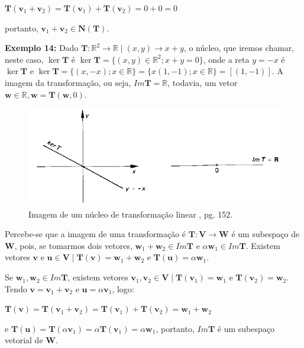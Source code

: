 \centerline{$\mathbf{T}(\mathbf{v}_1 + \mathbf{v}_2) = \mathbf{T}(\mathbf{v}_1) + \mathbf{T}(\mathbf{v}_2) = 0 + 0 = 0$}

\noindent portanto, $\mathbf{v}_1 + \mathbf{v}_2 \in \mathbf{N}(\mathbf{T})$. 

\noindent\textbf{Exemplo 14:} Dado $\mathbf{T}: \mathbb{R}^2 \longrightarrow \mathbb{R} \mid (x, y) \rightarrow x + y$, o núcleo, que iremos chamar, neste caso, $\ker\mathbf{T}$ é $\ker\mathbf{T} = \{(x, y) \in \mathbb{R}^2; x + y = 0\}$, onde a reta $y = -x$ é $\ker\mathbf{T}$ e $\ker\mathbf{T} = \{(x, -x); x \in \mathbb{R}\} = \{x(1, -1); x \in \mathbb{R}\} = [(1, -1)]$. A imagem da transformação, ou seja, $Im\mathbf{T} = \mathbb{R}$, todavia, um vetor $\mathbf{w} \in \mathbb{R}, \mathbf{w} = \mathbf{T}(\mathbf{w}, 0)$.

\begin{figure}[H]
	\centering
	\includegraphics[scale=1.00]{t_nucleo2.png}
	\caption{Imagem de um núcleo de transformação linear \cite{boldrini1980}, pg. 152.}
\end{figure}

Percebe-se que a imagem de uma transformação é $\mathbf{T}: \mathbf{V} \longrightarrow \mathbf{W}$ é um subespaço de $\mathbf{W}$, pois, se tomarmos dois vetores, $\mathbf{w}_1 + \mathbf{w}_2 \in Im\mathbf{T}$ e $\alpha\mathbf{w}_1 \in Im\mathbf{T}$. Existem vetores $\mathbf{v}$ e $\mathbf{u} \in \mathbf{V} \mid \mathbf{T}(\mathbf{v}) = \mathbf{w}_1 + \mathbf{w}_2$ e $\mathbf{T}(\mathbf{u}) = \alpha\mathbf{w}_1$.

Se $\mathbf{w}_1, \mathbf{w}_2 \in Im\mathbf{T}$, existem vetores $\mathbf{v}_1, \mathbf{v}_2 \in \mathbf{V} \mid \mathbf{T}(\mathbf{v}_1) = \mathbf{w}_1$ e $\mathbf{T}(\mathbf{v}_2) = \mathbf{w}_2$. Tendo $\mathbf{v} = \mathbf{v}_1 + \mathbf{v}_2$ e $\mathbf{u} = \alpha\mathbf{v}_1$, logo:

\centerline{$\mathbf{T}(\mathbf{v}) = \mathbf{T}(\mathbf{v}_1 + \mathbf{v}_2) = \mathbf{T}(\mathbf{v}_1) + \mathbf{T}(\mathbf{v}_2) = \mathbf{w}_1 + \mathbf{w}_2$} 
\noindent e $\mathbf{T}(\mathbf{u}) = \mathbf{T}(\alpha\mathbf{v}_1) = \alpha\mathbf{T}(\mathbf{v}_1) = \alpha\mathbf{w}_1$, portanto, $Im\mathbf{T}$ é um subespaço vetorial de $\mathbf{W}$.

